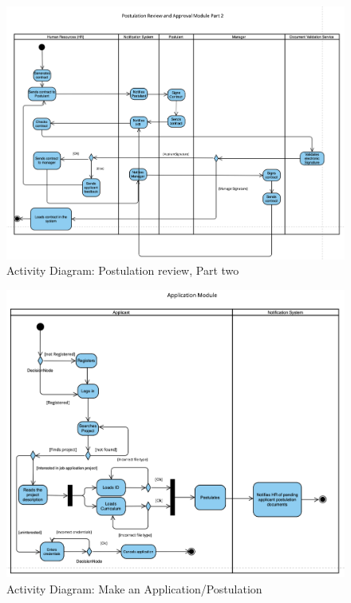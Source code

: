 \documentclass{scrreprt}
\begin{document}
\begin{figure}[H]
	\centering
	\includegraphics[width=\textwidth]{AD/AD2.png}
	\caption{Activity Diagram: Postulation review, Part two}
	\label{fig:AD2}
\end{figure}

\begin{figure}[H]
	\centering
	\includegraphics[width=\textwidth]{AD/AD3.png}
	\caption{Activity Diagram: Make an Application/Postulation}
	\label{fig:AD3}
\end{figure}
\end{document}
